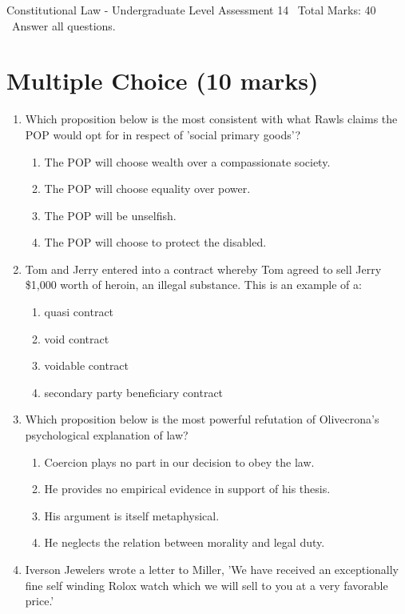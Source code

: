 \documentclass[12pt]{article}
\begin{document}
\begin{center}
Constitutional Law - Undergraduate Level Assessment 14 \
Total Marks: 40 \
Answer all questions.
\end{center}

\section*{Multiple Choice (10 marks)}
\begin{enumerate}[label=\arabic*.]
\item Which proposition below is the most consistent with what Rawls claims the POP would opt for in respect of 'social primary goods'?
\begin{enumerate}[label=(\alph*)]
    \item The POP will choose wealth over a compassionate society.
    \item The POP will choose equality over power.
    \item The POP will be unselfish.
    \item The POP will choose to protect the disabled.
\end{enumerate}
\item Tom and Jerry entered into a contract whereby Tom agreed to sell Jerry \$1,000 worth of heroin, an illegal substance. This is an example of a:
\begin{enumerate}[label=(\alph*)]
    \item quasi contract
    \item void contract
    \item voidable contract
    \item secondary party beneficiary contract
\end{enumerate}
\item Which proposition below is the most powerful refutation of Olivecrona's psychological explanation of law?
\begin{enumerate}[label=(\alph*)]
    \item Coercion plays no part in our decision to obey the law.
    \item He provides no empirical evidence in support of his thesis.
    \item His argument is itself metaphysical.
    \item He neglects the relation between morality and legal duty.
\end{enumerate}
\item Iverson Jewelers wrote a letter to Miller, 'We have received an exceptionally fine self winding Rolox watch which we will sell to you at a very favorable price.'

\end{enumerate}
\end{document}
